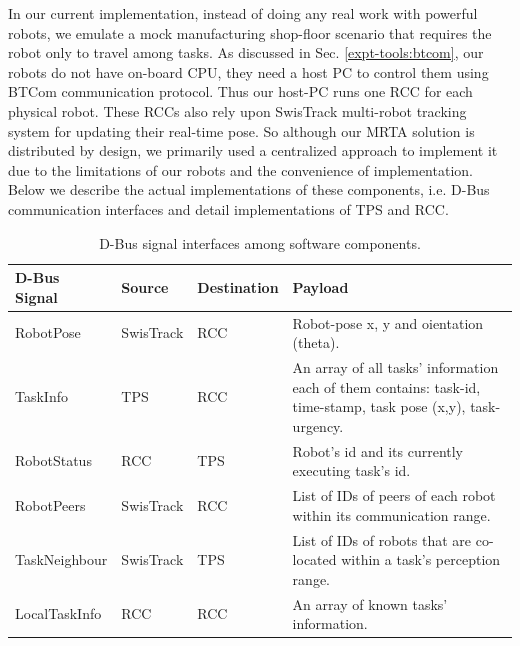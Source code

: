 \documentclass[final,5p,times,twocolumn]{elsarticle}
\begin{document}
In our current implementation, instead of doing any real work with powerful robots, we emulate a mock manufacturing shop-floor scenario that requires the robot only to travel among tasks. As discussed in Sec. \ref{expt-tools:btcom}, our robots do not have on-board CPU, they need a host PC to  control them using BTCom communication protocol. Thus our host-PC  runs one RCC for each physical robot. These RCCs also rely upon SwisTrack multi-robot tracking system for updating their real-time pose. So although our MRTA solution is distributed by design, we primarily used a centralized approach to implement it due to the limitations of our robots and the convenience of implementation. Below we describe the actual implementations of these components, i.e. D-Bus communication interfaces and detail implementations of TPS and RCC.
\begin{table}
\caption{D-Bus signal interfaces among software components.}
\label{table:dbus-interfaces}
\begin{center}
\begin{tabular}{|l|l|l|p{2in}|}
\hline D-Bus Signal &  Source & Destination  & Payload \\ 
\hline RobotPose & SwisTrack & RCC  & Robot-pose x, y and oientation (theta). \\ 
\hline TaskInfo & TPS & RCC & An array of all tasks' information each of them contains: task-id, time-stamp, task pose (x,y), task-urgency. \\ 
\hline RobotStatus & RCC & TPS & Robot's id and its currently executing task's id. \\ 
\hline RobotPeers & SwisTrack & RCC & List of IDs of peers of each robot within its communication range.  \\ 
\hline TaskNeighbour & SwisTrack & TPS &  List of IDs of robots that are co-located within a task's perception range.\\ 
\hline LocalTaskInfo & RCC & RCC & An array of known tasks' information.\\
\hline 
\end{tabular}
\end{center} 
\end{table}
\end{document}

